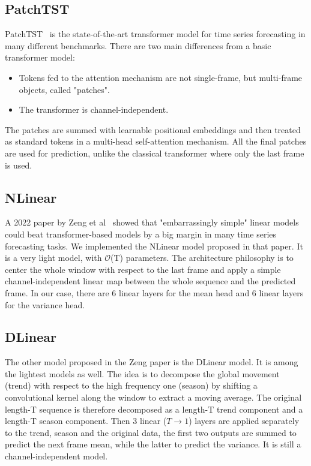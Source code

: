 \documentclass[
reprint,
aps,
prd,
superscriptaddress,
nofootinbib
]{revtex4-2}
\begin{document}
\subsection{PatchTST}

PatchTST~\cite{nie2023timeseriesworth64} is the state-of-the-art transformer model for time series forecasting in many different benchmarks. There are two main differences from a basic transformer model:
\begin{itemize}
    \item Tokens fed to the attention mechanism are not single-frame, but multi-frame objects, called "patches".
    \item The transformer is channel-independent.
\end{itemize}

The patches are summed with learnable positional embeddings and then treated as standard tokens in a multi-head self-attention mechanism. All the final patches are used for prediction, unlike the classical transformer where only the last frame is used.



\subsection{NLinear}

A 2022 paper by Zeng et al~\cite{zeng2022transformers} showed that "embarrassingly simple" linear models could beat transformer-based models by a big margin in many time series forecasting tasks. We implemented the NLinear model proposed in that paper. It is a very light model, with $\mathcal{O}$(T) parameters. The architecture philosophy is to center the whole window with respect to the last frame and apply a simple channel-independent linear map between the whole sequence and the predicted frame. In our case, there are $6$ linear layers for the mean head and 6 linear layers for the variance head.


\subsection{DLinear}

The other model proposed in the Zeng paper is the DLinear model. It is among the lightest models as well. The idea is to decompose the global movement (trend) with respect to the high frequency one (season) by shifting a convolutional kernel along the window to extract a moving average. The original length-T sequence is therefore decomposed as a length-T trend component and a length-T season component. Then 3 linear ($T \to 1$) layers are applied separately to the trend, season and the original data, the first two outputs are summed to predict the next frame mean, while the latter to predict the variance. It is still a channel-independent model.
\end{document}
